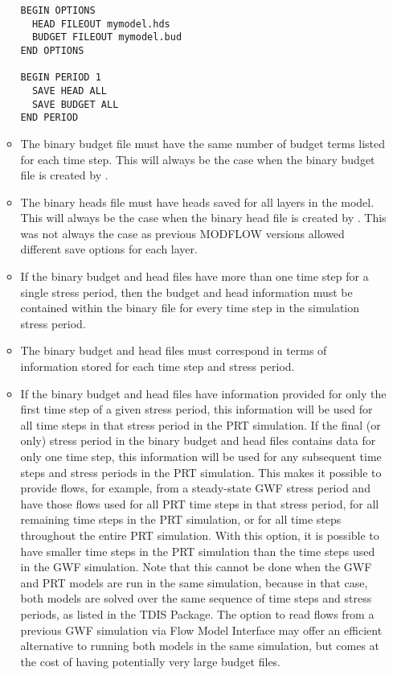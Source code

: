 \begin{itemize}
\begin{itemize}
\begin{verbatim}
BEGIN OPTIONS
  HEAD FILEOUT mymodel.hds
  BUDGET FILEOUT mymodel.bud
END OPTIONS

BEGIN PERIOD 1
  SAVE HEAD ALL
  SAVE BUDGET ALL
END PERIOD
\end{verbatim}

\item The binary budget file must have the same number of budget terms listed for each time step.  This will always be the case when the binary budget file is created by \mf.
\item The binary heads file must have heads saved for all layers in the model.  This will always be the case when the binary head file is created by \mf.  This was not always the case as previous MODFLOW versions allowed different save options for each layer.
\item If the binary budget and head files have more than one time step for a single stress period, then the budget and head information must be contained within the binary file for every time step in the simulation stress period.
\item The binary budget and head files must correspond in terms of information stored for each time step and stress period.
\item If the binary budget and head files have information provided for only the first time step of a given stress period, this information will be used for all time steps in that stress period in the PRT simulation. If the final (or only) stress period in the binary budget and head files contains data for only one time step, this information will be used for any subsequent time steps and stress periods in the PRT simulation. This makes it possible to provide flows, for example, from a steady-state GWF stress period and have those flows used for all PRT time steps in that stress period, for all remaining time steps in the PRT simulation, or for all time steps throughout the entire PRT simulation. With this option, it is possible to have smaller time steps in the PRT simulation than the time steps used in the GWF simulation. Note that this cannot be done when the GWF and PRT models are run in the same simulation, because in that case, both models are solved over the same sequence of time steps and stress periods, as listed in the TDIS Package. The option to read flows from a previous GWF simulation via Flow Model Interface may offer an efficient alternative to running both models in the same simulation, but comes at the cost of having potentially very large budget files.
\end{itemize}

\end{itemize}

